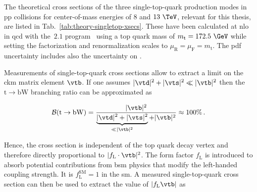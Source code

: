 The theoretical cross sections of the three single-top-quark production modes in pp collisions for center-of-mass energies of $8$ and $13~\TeV$, relevant for this thesis, are listed in Tab.~\ref{tab:theory-singletop-xsecs}. These have been calculated at \gls{nlo} in \gls{qcd} with the \HATHOR\,$2.1$ program~\cite{Aliev:2010zk,Kant:2014oha} using a top quark mass of $m_\mathrm{t}=172.5~\GeV$ while setting the factorization and renormalization scales to $\mu_\mathrm{R}=\mu_\mathrm{F}=m_\mathrm{t}$. The \gls{pdf} uncertainty includes also the uncertainty on \as.


Measurements of single-top-quark cross sections allow to extract a limit on the \gls{ckm} matrix element $\vtb$. If one assumes $|\vtd|^2+|\vts|^2\ll|\vtb|^2$ then the $\mathrm{t}\to\mathrm{bW}$ branching ratio can be approximated as

\begin{equation}
\mathcal{B}(\mathrm{t}\to\mathrm{bW})=\frac{|\vtb|^2}{\underbrace{|\vtd|^2+|\vts|^2}_{\ll|\vtb|^2}+|\vtb|^2}\approx 100\%\,.
\end{equation}

Hence, the cross section is independent of the top quark decay vertex and therefore directly proportional to $|f_\mathrm{L}\cdot\vtb|^2$. The form factor $f_\mathrm{L}$ is introduced to absorb potential contributions from \gls{bsm} physics that modify the left-handed coupling strength. It is $f_\mathrm{L}^\mathrm{SM}=1$ in the \gls{sm}. A measured single-top-quark cross section can then be used to extract the value of $|f_\mathrm{L}\vtb|$ as

